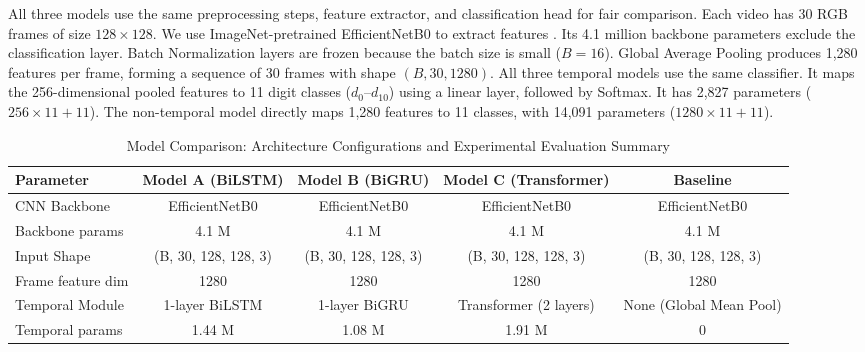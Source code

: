 \documentclass[journal]{IEEEtran}
\begin{document}
All three models use the same preprocessing steps, feature extractor, and classification head for fair comparison. Each video has 30 RGB frames of size $128 \times 128$. We use ImageNet-pretrained EfficientNetB0 to extract features \cite{tan2019efficientnet}. Its 4.1 million backbone parameters exclude the classification layer. Batch Normalization layers are frozen because the batch size is small ($B=16$). Global Average Pooling produces 1,280 features per frame, forming a sequence of 30 frames with shape $(B,30,1280)$.
All three temporal models use the same classifier. It maps the 256-dimensional pooled features to 11 digit classes ($d_0$–$d_{10}$) using a linear layer, followed by Softmax. It has 2,827 parameters ($256 \times 11 + 11$). The non-temporal model directly maps 1,280 features to 11 classes, with 14,091 parameters ($1280 \times 11 + 11$).
\begin{table}[!t]
    \centering
    \caption{Model Comparison: Architecture Configurations and Experimental Evaluation Summary}
    \label{tab:proposed_models}
    \fontsize{7pt}{9pt}\selectfont
    \setlength{\tabcolsep}{3pt}
    \renewcommand{\arraystretch}{1.2}
    \begin{tabular}{l|c|c|c|c}
        \hline
        \textbf{Parameter}    & \textbf{Model A (BiLSTM)}   & \textbf{Model B (BiGRU)}    & \textbf{Model C (Transformer)} & \textbf{Baseline}           \\
        \hline
        CNN Backbone          & EfficientNetB0             & EfficientNetB0             & EfficientNetB0                & EfficientNetB0             \\
        Backbone params       & 4.1 M                       & 4.1 M                       & 4.1 M                          & 4.1 M                       \\
        Input Shape           & (B, 30, 128, 128, 3)        & (B, 30, 128, 128, 3)        & (B, 30, 128, 128, 3)           & (B, 30, 128, 128, 3)        \\
        Frame feature dim     & 1280                        & 1280                        & 1280                           & 1280                        \\
        Temporal Module       & 1-layer BiLSTM              & 1-layer BiGRU               & Transformer (2 layers)         & None (Global Mean Pool)     \\
        Temporal params       & 1.44 M                      & 1.08 M                      & 1.91 M                         & 0                           \\

\end{tabular}
\end{table}
\end{document}

